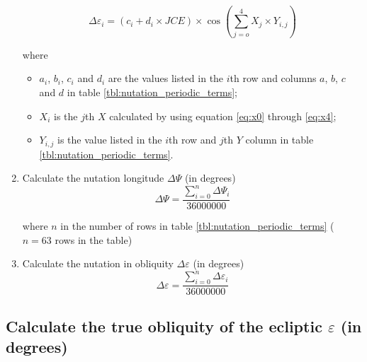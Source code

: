 \documentclass{article}
\begin{document}
\begin{enumerate}
  \begin{equation}
    \label{eq:delta_epsilon_i}
    \Delta\varepsilon_i = (c_i + d_i \times JCE) \times \cos\left(\sum_{j=o}^4 X_j \times Y_{i,j}\right)
  \end{equation}

  \par where
  \begin{itemize}
  \item $a_i$, $b_i$, $c_i$ and $d_i$ are the values listed in the
    $i$th row and columns $a$, $b$, $c$ and $d$ in table
    \ref{tbl:nutation_periodic_terms};
  \item $X_i$ is the $j$th $X$ calculated by using equation
    \ref{eq:x0} through \ref{eq:x4};
  \item $Y_{i,j}$ is the value listed in the $i$th row and $j$th $Y$
    column in table \ref{tbl:nutation_periodic_terms}.
  \end{itemize}

\item Calculate the nutation longitude $\Delta\Psi$ (in degrees)
  \begin{equation}
    \label{eq:delta_psi}
    \Delta\Psi = \frac{\sum_{i=0}^n\Delta\Psi_i}{36000000}
  \end{equation}

  \par where $n$ in the number of rows in table
  \ref{tbl:nutation_periodic_terms} ($n = 63$ rows in the table)

\item Calculate the nutation in obliquity $\Delta\varepsilon$ (in degrees)
  \begin{equation}
    \label{eq:delta_epsilon}
    \Delta\varepsilon = \frac{\sum_{i=0}^n\Delta\varepsilon_i}{36000000}
  \end{equation}
\end{enumerate}

\subsection{Calculate the true obliquity of the ecliptic $\varepsilon$ (in
  degrees)}
\end{document}
